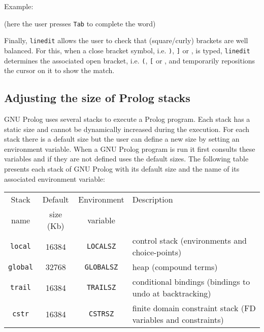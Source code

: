 Example:

\begin{CodeTwoCols}
 {(here the user presses \texttt{Tab} to complete the word)}
\SkipLine
{}
\end{CodeTwoCols}

Finally, \texttt{linedit} allows the user to check that (square/curly)
brackets are well balanced. For this, when a close bracket symbol, i.e.
\texttt{)}, \texttt{]} or \texttt{{\rb}}, is typed, \texttt{linedit} determines
the associated open bracket, i.e. \texttt{(}, \texttt{[} or \texttt{{\lb}}, and
temporarily repositions the cursor on it to show the match.

\subsection{Adjusting the size of Prolog stacks}
\label{Adjusting-the-size-of-Prolog-stacks}
GNU Prolog uses several stacks to execute a Prolog program. Each stack has a
static size and cannot be dynamically increased during the execution. For
each stack there is a default size but the user can define a new size by
setting an environment variable. When a GNU Prolog program is run it first
consults these variables and if they are not defined uses the default sizes.
The following table presents each stack of GNU Prolog with its default size
and the name of its associated environment variable:

\begin{tabular}{|c|c|c|l|}
\hline

Stack & Default   & Environment & Description \\
name  & size (Kb) & variable    & \\

\hline\hline

\texttt{local} & 16384 & \texttt{LOCALSZ} & control stack (environments
and choice-points) \\

\hline

\texttt{global} & 32768 & \texttt{GLOBALSZ} & heap (compound terms)
\\

\hline

\texttt{trail} & 16384 & \texttt{TRAILSZ} & conditional bindings (bindings
to undo at backtracking) \\

\hline

\texttt{cstr} & 16384 & \texttt{CSTRSZ} & finite domain constraint stack
(FD variables and constraints) \\

\hline
\end{tabular}

